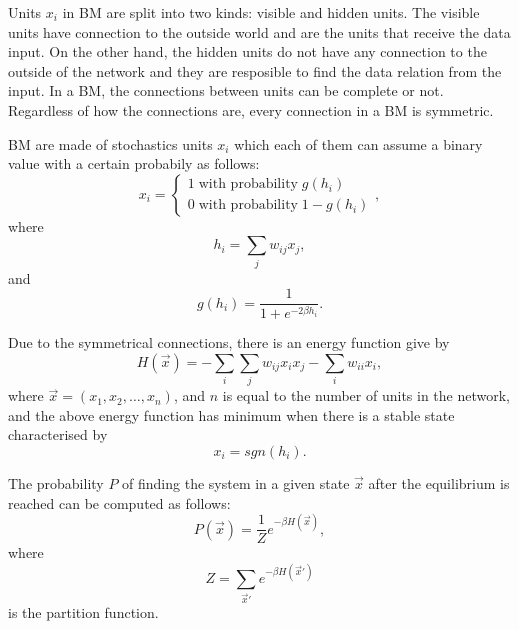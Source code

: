 Units $x_{i}$ in BM are split into two kinds: visible and hidden units. 
The visible units have connection to the outside world and are the units that receive the data input. 
On the other hand, the hidden units do not have any connection to the outside of the network and they are resposible to find the data relation from the input. 
In a BM, the connections between units can be complete or not. 
Regardless of how the connections are, every connection in a BM is symmetric.

BM are made of stochastics units $x_{i}$ which each of them can assume a binary value with a certain probabily as follows:
\begin{equation}
  x_{i} =
    \begin{cases}
      1 \; \text{with probability} \; g(h_{i}) \\
      0 \; \text{with probability} \; 1 - g(h_{i})
    \end{cases},
  \label{eq:eq1}
\end{equation}
where
\begin{equation}
  h_{i} = \sum_{j}w_{ij}x_{j},
  \label{eq:eq2}
\end{equation}
and
\begin{equation}
  g(h_{i}) = \frac{1}{1 + e^{-2 \beta h_{i}}}.
  \label{eq:eq3}
\end{equation}

Due to the symmetrical connections, there is an energy function give by
\begin{equation}
  H(\vec{x}) = - \sum_{i} \sum_{j} w_{ij}x_{i}x_{j} - \sum_{i} w_{ii}x_{i},
  \label{eq:eq4}
\end{equation}
where $\vec{x} = (x_{1}, x_{2}, \dots, x_{n})$, and $n$ is equal to the number of units in the network, and the above energy function has minimum when there is a stable state characterised by
\begin{equation}
  x_{i} = sgn(h_{i}).
  \label{eq:eq5}
\end{equation}

The probability $P$ of finding the system in a given state $\vec{x}$ after the equilibrium is reached can be computed as follows:
\begin{equation}
  P(\vec{x}) = \frac{1}{Z} e^{- \beta H(\vec{x})},
  \label{eq:eq6}
\end{equation}
where
\begin{equation}
  Z = \sum_{\vec{x}'} e^{- \beta H(\vec{x}')}
  \label{eq:eq7}
\end{equation}
is the partition function.

